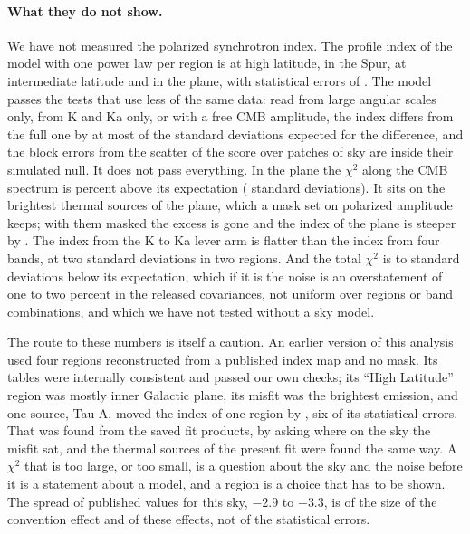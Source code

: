\paragraph{What they do not show.} We have not measured the polarized synchrotron index. The profile
index of the model with one power law per region is  at high latitude, in the Spur, at
intermediate latitude and in the plane, with statistical errors of . The model passes
the tests that use less of the same data: read from large angular scales only, from K and Ka only,
or with a free CMB amplitude, the index differs from the full one by at most  of the
standard deviations expected for the difference, and the block errors from the scatter of the score
over patches of sky are inside their simulated null. It does not pass everything. In the plane the
$\chi^2$ along the CMB spectrum is  percent above its expectation
( standard deviations). It sits on the brightest thermal sources of the
plane, which a mask set on polarized amplitude keeps; with them masked the excess is gone and the
index of the plane is steeper by . The index from the K to Ka
lever arm is flatter than the index from four bands, at two standard deviations in two regions. And
the total $\chi^2$ is  to  standard deviations below its expectation,
which if it is the noise is an overstatement of one to two percent in the released covariances, not
uniform over regions or band combinations, and which we have not tested without a sky model.

The route to these numbers is itself a caution. An earlier version of this analysis used four
regions reconstructed from a published index map and no mask. Its tables were internally consistent
and passed our own checks; its ``High Latitude'' region was mostly inner Galactic plane, its misfit
was the brightest emission, and one source, Tau A, moved the index of one region by
, six of its statistical errors. That was found from the saved fit products,
by asking where on the sky the misfit sat, and the thermal sources of the present fit were found the
same way. A $\chi^2$ that is too large, or too small, is a question
about the sky and the noise before it is a statement about a model, and a region is a choice that
has to be shown. The spread of published values for this sky, $-2.9$ to $-3.3$, is of the size of the
convention effect and of these effects, not of the statistical errors.

